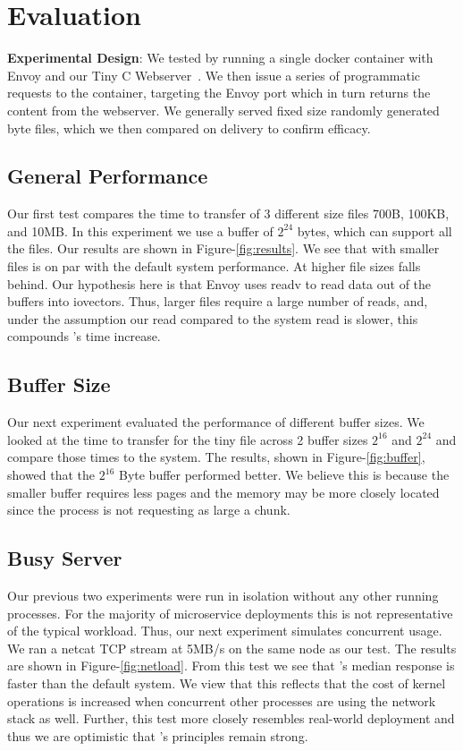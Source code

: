 \section{Evaluation}
\label{sec:evaluation}
\textbf{Experimental Design}:
We tested \sysname by running a single docker container with Envoy and our Tiny C Webserver~\cite{tiny}.
We then issue a series of programmatic requests to the container, targeting the Envoy port which in turn returns the content from the webserver.
We generally served fixed size randomly generated byte files, which we then compared on delivery to confirm efficacy.

\subsection{General Performance}
Our first test compares the time to transfer of 3 different size files 700B, 100KB, and 10MB.
In this experiment we use a buffer of $2^{24}$ bytes, which can support all the files.
Our results are shown in Figure-\ref{fig:results}.
We see that with smaller files \sysname is on par with the default system performance.
At higher file sizes \sysname falls behind.
Our hypothesis here is that Envoy uses readv to read data out of the buffers into iovectors.
Thus, larger files require a large number of reads, and, under the assumption our read compared to the system read is slower, this compounds \sysname's time increase.

\subsection{Buffer Size}
Our next experiment evaluated the performance of different buffer sizes.
We looked at the time to transfer for the tiny file across 2 buffer sizes $2^{16}$ and $2^{24}$ and compare those times to the system.
The results, shown in Figure-\ref{fig:buffer}, showed that the $2^{16}$ Byte buffer performed better.
We believe this is because the smaller buffer requires less pages and the memory may be more closely located since the process is not requesting as large a chunk.

\subsection{Busy Server}
Our previous two experiments were run in isolation without any other running processes.
For the majority of microservice deployments this is not representative of the typical workload.
Thus, our next experiment simulates concurrent usage.
We ran a netcat TCP stream at 5MB/s on the same node as our \sysname test.
The results are shown in Figure-\ref{fig:netload}.
From this test we see that \sysname's median response is faster than the default system.
We view that this reflects that the cost of kernel operations is increased when concurrent other processes are using the network stack as well.
Further, this test more closely resembles real-world deployment and thus we are optimistic that \sysname's principles remain strong.

